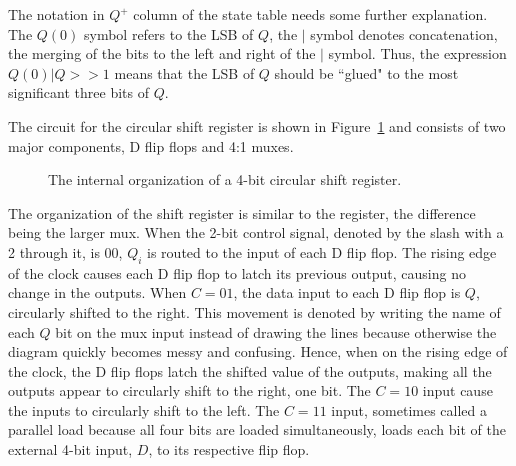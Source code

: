 The notation in $Q^+$ column of the state table needs some further
explanation.  The $Q(0)$ symbol refers to the LSB of $Q$, the $|$ symbol 
denotes concatenation, the merging of the bits to the left and right
of the $|$  symbol.  Thus, the expression $Q(0) | Q>>1$ means that the 
LSB of $Q$ should be ``glued" to the most significant three bits of
$Q$.

The circuit for the circular shift register is shown in 
Figure~\ref{fig:ShiftReg} and consists of two major components, D flip 
flops and 4:1 muxes.  

\begin{figure}[ht]
\caption{The internal organization of a 4-bit circular shift register.}
\label{fig:ShiftReg}

\end{figure}

The organization of the shift register is similar to the register, the 
difference being the larger mux.  When the 2-bit control signal,
denoted by the slash with a 2 through it, is 00, $Q_i$ is routed to
the input of each D flip flop.  The rising edge of the clock 
causes each D flip flop to latch its previous output, causing no 
change in the outputs.  When $C=01$, the data input to each D flip 
flop is $Q$, circularly shifted to the right.  This movement is denoted by
writing the name of each $Q$ bit on the mux input instead of drawing
the lines because otherwise the diagram quickly becomes messy and confusing.
Hence, when on the rising edge of the clock, the D flip flops 
latch the shifted value of the outputs, making all the outputs 
appear to circularly shift to the right, one bit.  The $C=10$ input
cause the inputs to circularly shift to the left.  The $C=11$ input,
sometimes called a parallel load because all four bits are loaded
simultaneously, loads each bit of the external 4-bit input, $D$, to its
respective flip flop.

